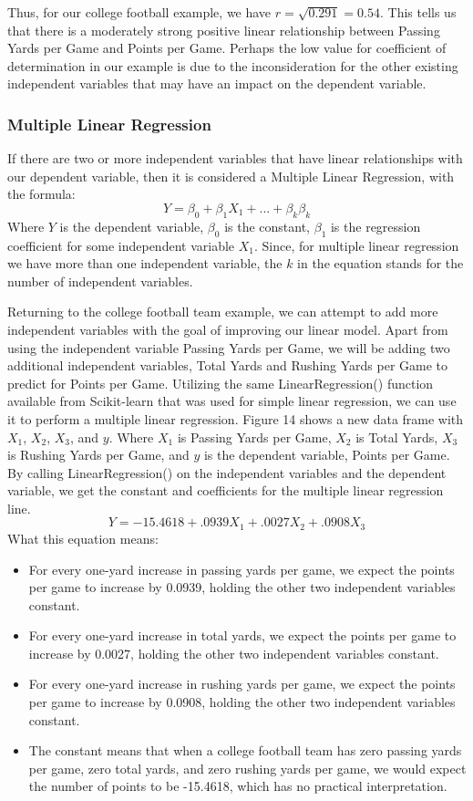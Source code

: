 \documentclass[a4paper,12pt]{report}
\begin{document}

Thus, for our college football example, we have $r=\sqrt{0.291}=0.54$. This tells us that there is a moderately strong positive linear relationship between Passing Yards per Game and Points per Game. Perhaps the low value for coefficient of determination in our example is due to the inconsideration for the other existing independent variables that may have an impact on the dependent variable. 


\subsubsection{Multiple Linear Regression}
If there are two or more independent variables that have linear relationships with our dependent variable, then it is considered a Multiple Linear Regression, with the formula:
$$Y=\beta_0+\beta_1X_1+...+\beta_k\beta_k$$
Where $Y$ is the dependent variable, $\beta_0$ is the constant, $\beta_1$ is the regression coefficient for some independent variable $X_1$. Since, for multiple linear regression we have more than one independent variable, the $k$ in the equation stands for the number of independent variables.

Returning to the college football team example, we can attempt to add more independent variables with the goal of improving our linear model. Apart from using the independent variable Passing Yards per Game, we will be adding two additional independent variables, Total Yards and Rushing Yards per Game to predict for Points per Game. Utilizing the same LinearRegression() function available from Scikit-learn that was used for simple linear regression, we can use it to perform a multiple linear regression. Figure 14 shows a new data frame with $X_1$, $X_2$, $X_3$, and $y$. Where $X_1$ is Passing Yards per Game, $X_2$ is Total Yards, $X_3$ is Rushing Yards per Game, and $y$ is the dependent variable, Points per Game. By calling LinearRegression() on the independent variables and the dependent variable, we get the constant and coefficients for the multiple linear regression line.
$$Y=-15.4618+.0939X_1+.0027X_2+.0908X_3$$
What this equation means:
\vspace*{-.9cm}
\begin{itemize}[,]
    \setlength\itemsep{-.1cm}
    \item For every one-yard increase in passing yards per game, we expect the points per game to increase by 0.0939, holding the other two independent variables constant.
    \item For every one-yard increase in total yards, we expect the points per game to increase by 0.0027, holding the other two independent variables constant.
    \item For every one-yard increase in rushing yards per game, we expect the points per game to increase by 0.0908, holding the other two independent variables constant.
    \item The constant means that when a college football team has zero passing yards per game, zero total yards, and zero rushing yards per game, we would expect the number of points to be -15.4618, which has no practical interpretation. 
\end{itemize}
\end{document}
